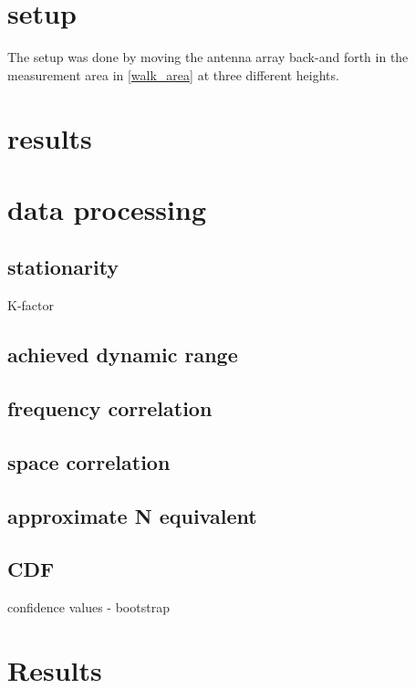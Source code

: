 \section{setup}
The setup was done by moving the antenna array back-and forth in the measurement area in \autoref{walk_area} at three different heights.
\section{results}
\section{data processing}
\subsection{stationarity}
K-factor
\subsection{achieved dynamic range}
\subsection{frequency correlation}
\subsection{space correlation}
\subsection{approximate N equivalent}
\subsection{CDF}
confidence values - bootstrap

\section{Results}